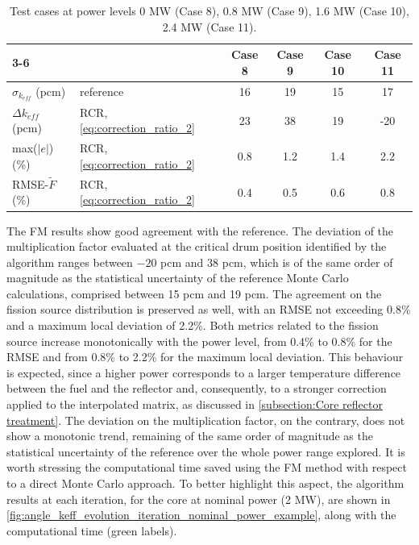 \documentclass[preprint,review,12pt]{elsarticle}
\newif\ifhighlight
\newcommand{\rtwo}[1]{\ifhighlight\textcolor{revtwo}{#1}\else#1\fi}
\begin{document}
\begin{table}[h!]
\FloatBarrier
\caption{Test cases at power levels 0 MW (Case 8), 0.8 MW (Case 9), 1.6 MW (Case 10), 2.4 MW (Case 11).}
\centering
\begin{tabular}{llcccc}
\cline{3-6}
&                                                  & Case 8 & Case 9 & Case 10 & Case 11 \\ \hline
$\sigma_{k_{eff}}$ (pcm) & \multicolumn{1}{l|}{\rtwo{reference}}         &    16    &    19    & 15  & 17    \\ \hline
$\Delta k_{eff}$ (pcm)   
& \multicolumn{1}{l|}{\rtwo{RCR, \cref{eq:correction_ratio_2}}}      &    23    &    38    & 19  & -20  \\ \hline
max($|e|$) (\%)     
& \multicolumn{1}{l|}{\rtwo{RCR, \cref{eq:correction_ratio_2}}}    &    0.8   &   1.2     &     1.4   & 2.2 \\ \hline
RMSE-$\tilde{F}$ (\%)         
& \multicolumn{1}{l|}{\rtwo{RCR, \cref{eq:correction_ratio_2}}}    &      0.4  &   0.5   &   0.6     & 0.8 \\ \hline
\end{tabular}
\label{tab:testing_cases_8_9_10_11}
\end{table}

The FM results show good agreement with the reference. \rtwo{The deviation of the multiplication factor evaluated at the critical drum position identified by the algorithm ranges between $-20$ pcm and 38 pcm, which is of the same order of magnitude as the statistical uncertainty of the reference Monte Carlo calculations, comprised between 15 pcm and 19 pcm. The agreement on the fission source distribution is preserved as well, with an RMSE not exceeding 0.8\% and a maximum local deviation of 2.2\%. Both metrics related to the fission source increase monotonically with the power level, from 0.4\% to 0.8\% for the RMSE and from 0.8\% to 2.2\% for the maximum local deviation. This behaviour is expected, since a higher power corresponds to a larger temperature difference between the fuel and the reflector and, consequently, to a stronger correction applied to the interpolated matrix, as discussed in \cref{subsection:Core reflector treatment}. The deviation on the multiplication factor, on the contrary, does not show a monotonic trend, remaining of the same order of magnitude as the statistical uncertainty of the reference over the whole power range explored.} It is worth stressing the computational time saved using the FM method with respect to a direct Monte Carlo approach. To better highlight this aspect, the algorithm results at each iteration, for the core at nominal power (2 MW), are shown in \cref{fig:angle_keff_evolution_iteration_nominal_power_example}, along with the computational time (green labels).
\end{document}
